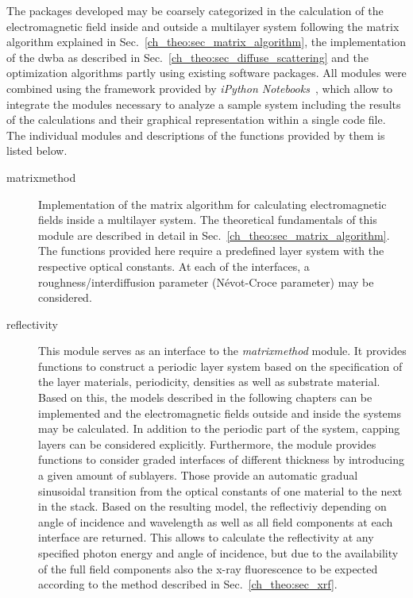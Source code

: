 The packages developed may be coarsely categorized in the calculation of the electromagnetic field inside and outside a multilayer system following the matrix algorithm explained in Sec.~\ref{ch_theo:sec_matrix_algorithm}, the implementation of the \gls{dwba} as described in Sec.~\ref{ch_theo:sec_diffuse_scattering} and the optimization algorithms partly using existing software packages. All modules were combined using the framework provided by \emph{iPython Notebooks}~\cite{perez_ipython:_2007}, which allow to integrate the modules necessary to analyze a sample system including the results of the calculations and their graphical representation within a single code file. The individual modules and descriptions of the functions provided by them is listed below.
\begin{description}
 \item[matrixmethod]{Implementation of the matrix algorithm for calculating electromagnetic fields inside a multilayer system. The theoretical fundamentals of this module are described in detail in Sec.~\ref{ch_theo:sec_matrix_algorithm}. The functions provided here require a predefined layer system with the respective optical constants. At each of the interfaces, a roughness/interdiffusion parameter (N\'{e}vot-Croce parameter) may be considered.}
 
 \item[reflectivity]{This module serves as an interface to the \emph{matrixmethod} module. It provides functions to construct a periodic layer system based on the specification of the layer materials, periodicity, densities as well as substrate material. Based on this, the models described in the following chapters can be implemented and the electromagnetic fields outside and inside the systems may be calculated. In addition to the periodic part of the system, capping layers can be considered explicitly. Furthermore, the module provides functions to consider graded interfaces of different thickness by introducing a given amount of sublayers. Those provide an automatic gradual sinusoidal transition from the optical constants of one material to the next in the stack. Based on the resulting model, the reflectiviy depending on angle of incidence and wavelength as well as all field components at each interface are returned. This allows to calculate the reflectivity at any specified photon energy and angle of incidence, but due to the availability of the full field components also the x-ray fluorescence to be expected according to the method described in Sec.~\ref{ch_theo:sec_xrf}.}
 

\end{description}
